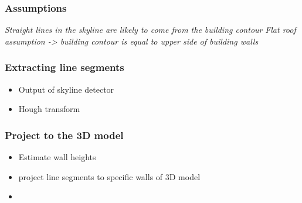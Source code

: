 \documentclass{beamer}
\begin{document}
\frame
{
	\frametitle{Assumptions}
	\emph{Straight lines in the skyline are likely to come from the building contour}
	\emph{Flat roof assumption -> building contour is equal to upper side of building walls}
}

\frame
{
	\frametitle{Extracting line segments}
	\begin{itemize}
	\item  <+-| alert@+> Output of skyline detector
	\item  <+-| alert@+> Hough transform
	\end{itemize}


}


\frame
{
	\frametitle{Project to the 3D model}
	\begin{itemize}
	\item  <+-| alert@+> Estimate wall heights 
	\item  <+-| alert@+> project line segments to specific walls of 3D model
	\item  <+-| alert@+>
	\end{itemize}
}
\end{document}
